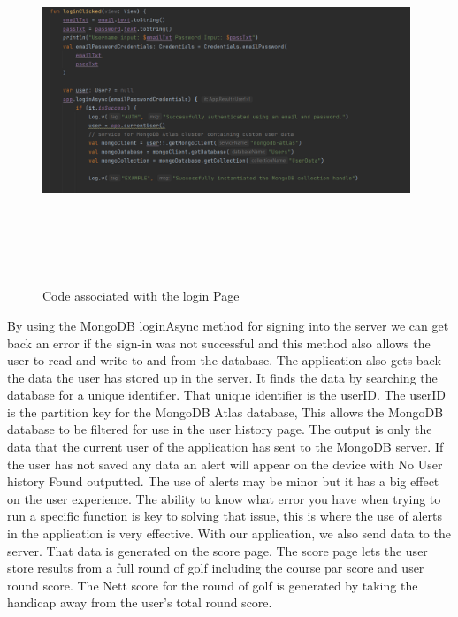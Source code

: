 \begin{figure}[H]
    \centering
    \includegraphics[width=11cm, height = 11cm]{img/mongoSignIn.PNG}
    \caption{Code associated with the login Page}
    \label{fig:Code associated with the login Page}
\end{figure}
By using the MongoDB loginAsync method for signing into the server we can get back an error if the sign-in was not successful and this method also allows the user to read and write to and from the database.
\newline
The application also gets back the data the user has stored up in the server. It finds the data by searching the database for a unique identifier. That unique identifier is the userID. The userID is the partition key for the MongoDB Atlas database, This allows the MongoDB database to be filtered for use in the user history page. The output is only the data that the current user of the application has sent to the MongoDB server. \newline
If the user has not saved any data an alert will appear on the device with No User history Found outputted. The use of alerts may be minor but it has a big effect on the user experience. The ability to know what error you have when trying to run a specific function is key to solving that issue, this is where the use of alerts in the application is very effective.
\newpage
With our application, we also send data to the server. That data is generated on the score page. The score page lets the user store results from a full round of golf including the course par score and user round score. The Nett score for the round of golf is generated by taking the handicap away from the user's total round score.
